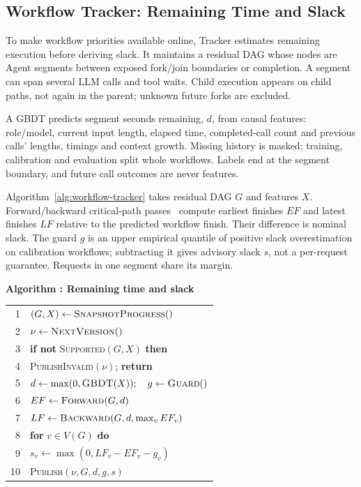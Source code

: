 \subsection{Workflow Tracker: Remaining Time and Slack}
\label{sec:workflow-protection}

To make workflow priorities available online, Tracker estimates remaining
execution before deriving slack. It maintains a residual DAG whose nodes
are Agent segments between exposed fork/join boundaries or completion.
A segment can span several LLM calls and tool waits. Child execution
appears on child paths, not again in the parent; unknown future forks
are excluded.

A GBDT predicts segment seconds remaining, $d$, from causal features: role/model,
current input length, elapsed time, completed-call count and previous
calls' lengths, timings and context growth. Missing history is masked;
training, calibration and evaluation split whole workflows. Labels end
at the segment boundary, and future call outcomes are never features.

Algorithm~\ref{alg:workflow-tracker} takes residual DAG $G$ and features
$X$. Forward/backward critical-path passes~\cite{kelley1959cpm} compute
earliest finishes $EF$ and latest finishes $LF$ relative to the predicted
workflow finish. Their difference is nominal slack. The guard $g$ is an
upper empirical quantile of positive slack overestimation on calibration
workflows; subtracting it gives advisory slack $s$, not a per-request
guarantee. Requests in one segment share its margin.

\par\medskip\noindent\begin{minipage}{\columnwidth}
\raggedright
 \label{alg:workflow-tracker}
 \textbf{Algorithm \thedesignalgorithm: Remaining time and slack}
 \par\smallskip
 \begin{tabularx}{\columnwidth}{@{}r@{\quad}X@{}}
 \toprule
 1 & $(G,X)\gets\textsc{SnapshotProgress}()$ \\
 2 & $\nu\gets\textsc{NextVersion}()$ \\
 3 & \textbf{if not} \textsc{Supported}$(G,X)$ \textbf{then} \\
 4 & \quad \textsc{PublishInvalid}$(\nu)$; \textbf{return} \\
 5 & $d\gets\max(0,\textsc{GBDT}(X));\quad g\gets\textsc{Guard}()$ \\
 6 & $EF\gets\textsc{Forward}(G,d)$ \\
 7 & $LF\gets\textsc{Backward}(G,d,\max_v EF_v)$ \\
 8 & \textbf{for} $v\in V(G)$ \textbf{do} \\
 9 & \quad $s_v\gets\max(0,LF_v-EF_v-g_v)$ \\
 10 & \textsc{Publish}$(\nu,G,d,g,s)$ \\
 \bottomrule
 \end{tabularx}
\end{minipage}\par\medskip

